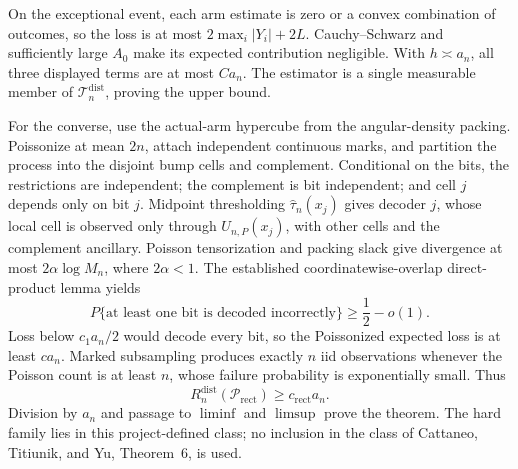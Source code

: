 On the exceptional event, each arm estimate is zero or a convex combination of outcomes, so the loss is at most \(2\max_i|Y_i|+2L\).  Cauchy--Schwarz and sufficiently large \(A_0\) make its expected contribution negligible.  With \(h\asymp a_n\), all three displayed terms are at most \(Ca_n\).  The estimator is a single measurable member of \(\mathcal T_n^{\mathrm{dist}}\), proving the upper bound.

For the converse, use the actual-arm hypercube from the angular-density packing.  Poissonize at mean \(2n\), attach independent continuous marks, and partition the process into the disjoint bump cells and complement.  Conditional on the bits, the restrictions are independent; the complement is bit independent; and cell \(j\) depends only on bit \(j\).  Midpoint thresholding \(\widehat\tau_n(x_j)\) gives decoder \(j\), whose local cell is observed only through \(U_{n,P}(x_j)\), with other cells and the complement ancillary.  Poisson tensorization and packing slack give divergence at most \(2\alpha\log M_n\), where \(2\alpha<1\).  The established coordinatewise-overlap direct-product lemma yields
\[
 P\{\text{at least one bit is decoded incorrectly}\}\geq\frac12-o(1).
\]
Loss below \(c_1a_n/2\) would decode every bit, so the Poissonized expected loss is at least \(ca_n\).  Marked subsampling produces exactly \(n\) iid observations whenever the Poisson count is at least \(n\), whose failure probability is exponentially small.  Thus
\[
 R_n^{\mathrm{dist}}(\mathcal P_{\mathrm{rect}})\geq c_{\mathrm{rect}}a_n.
\]
Division by \(a_n\) and passage to \(\liminf\) and \(\limsup\) prove the theorem.  The hard family lies in this project-defined class; no inclusion in the class of Cattaneo, Titiunik, and Yu, Theorem~6, is used.